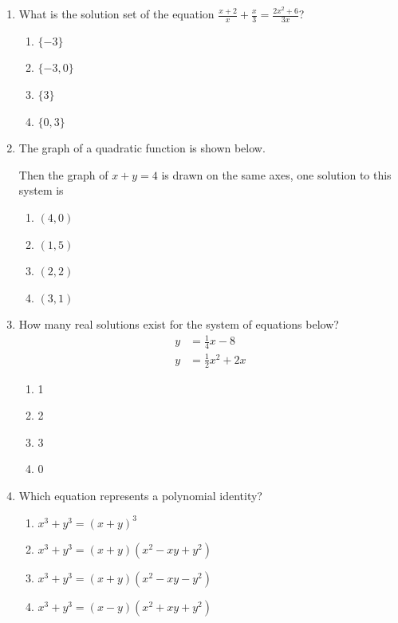 \documentclass[12pt, twoside]{article}
\begin{document}
\begin{enumerate}[itemsep=0.5cm]
\item What is the solution set of the equation \(\displaystyle \frac{x+2}{x} + \frac{x}{3} = \frac{2x^2+6}{3x}\)? %
\begin{enumerate}
    \item \(\{-3\}\)
    \item \(\{-3, 0\}\)
    \item \(\{3\}\)
    \item \(\{0, 3\}\)
\end{enumerate}

\item The graph of a quadratic function is shown below. %
\begin{center}
    \end{center}
Then the graph of $x + y = 4$ is drawn on the same axes, one solution
to this system is
\begin{enumerate}
    \item $(4,0)$
    \item $(1,5)$
    \item $(2,2)$
    \item $(3,1)$
\end{enumerate}

\item How many real solutions exist for the system of equations below? %
\begin{align*}
    y &= \frac{1}{4} x - 8 \\
    y &= \frac{1}{2} x^2 + 2x
\end{align*}
\begin{enumerate}
    \item 1
    \item 2
    \item 3
    \item 0
\end{enumerate}

\item Which equation represents a polynomial identity? %
\begin{enumerate}
    \item \(x^3 + y^3 = (x + y)^3\)
    \item \(x^3 + y^3 = (x + y)(x^2 - xy + y^2)\)
    \item \(x^3 + y^3 = (x + y)(x^2 - xy - y^2)\)
    \item \(x^3 + y^3 = (x - y)(x^2 + xy + y^2)\)
\end{enumerate}


\end{enumerate}
\end{document}

